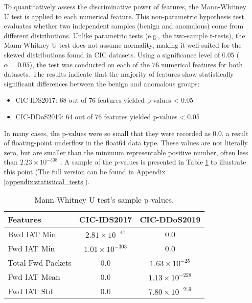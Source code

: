 To quantitatively assess the discriminative power of features, the Mann-Whitney U test is applied to each numerical feature. This non-parametric hypothesis test evaluates whether two independent samples (benign and anomalous) come from different distributions. Unlike parametric tests (e.g., the two-sample t-tests), the Mann-Whitney U test does not assume normality, making it well-suited for the skewed distributions found in CIC datasets. Using a significance level of 0.05 ($\alpha = 0.05$), the test was conducted on each of the 76 numerical features for both datasets. The results indicate that the majority of features show statistically significant differences between the benign and anomalous groups:

\begin{itemize}
    \item CIC-IDS2017: 68 out of 76 features yielded p-values < 0.05
    \item CIC-DDoS2019: 64 out of 76 features yielded p-values < 0.05
\end{itemize}

In many cases, the p-values were so small that they were recorded as 0.0, a result of floating-point underflow in the float64 data type. These values are not literally zero, but are smaller than the minimum representable positive number, often less than $2.23 \times 10^{-308}$ \citep{w3floatnum}. A sample of the p-values is presented in Table \ref{tbl:mannwhitneyu_results} to illustrate this point (The full version can be found in Appendix \ref{appendix:statistical_tests}).

\begin{table}[h]
    \caption{Mann-Whitney U test’s sample p-values.}
    \centering
    \begin{tabular}{l|c|c}
        Features & CIC-IDS2017 & CIC-DDoS2019 \\
        \hline\hline
        Bwd IAT Min  & $2.81 \times 10^{-47}$ & 0.0 \\
        Fwd IAT Min  & $1.01 \times 10^{-303}$ & 0.0 \\
        Total Fwd Packets  & 0.0 & $1.63 \times 10^{-25}$ \\
        Fwd IAT Mean  & 0.0 & $1.13 \times 10^{-228}$ \\
        Fwd IAT Std  & 0.0 & $7.80 \times 10^{-259}$ \\
    \end{tabular}
    \label{tbl:mannwhitneyu_results}
\end{table}

